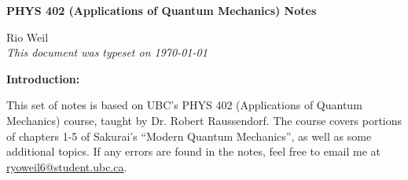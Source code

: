 \documentclass[10pt]{article}
\begin{document}
\begin{tcolorbox}
  \begin{center}
  \begin{Large}
    \textbf{PHYS 402 (Applications of Quantum Mechanics) Notes} \\
    \vspace{5pt}
  \end{Large}
  \begin{large}
        Rio Weil \\
\vspace{5pt}
    \emph{This document was typeset on \today}
  \end{large}
  \end{center}
\end{tcolorbox}

\begin{center}
  \textbf{Introduction:}

  This set of notes is based on UBC's PHYS 402 (Applications of Quantum Mechanics) course, taught by Dr. Robert Raussendorf. The course covers portions of chapters 1-5 of Sakurai's ``Modern Quantum Mechanics'', as well as some additional topics. If any errors are found in the notes, feel free to email me at \href{mailto:ryoweil6@student.ubc.ca}{ryoweil6@student.ubc.ca}.

\end{center}
\tableofcontents

\newpage


\newpage


\newpage


\newpage


\newpage

\end{document}
